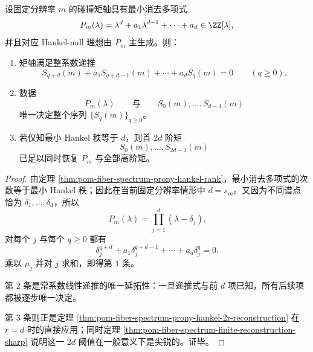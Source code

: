 \begin{theorem}\label{thm:conclusion-fixedresolution-principal-hankelnull-finite-determinacy}
设固定分辨率 \(m\) 的碰撞矩轴具有最小消去多项式
\[
P_m(\lambda)=\lambda^d+a_1\lambda^{d-1}+\cdots+a_d\in\ZZ[\lambda],
\]
并且对应 Hankel-null 理想由 \(P_m\) 主生成。则：
\begin{enumerate}
  \item 矩轴满足整系数递推
  \[
  S_{q+d}(m)+a_1S_{q+d-1}(m)+\cdots+a_dS_q(m)=0
  \qquad(q\ge 0).
  \]

  \item 数据
  \[
  P_m(\lambda)
  \qquad\text{与}\qquad
  S_0(m),\dots,S_{d-1}(m)
  \]
  唯一决定整个序列 \(\{S_q(m)\}_{q\ge 0}\)。

  \item 若仅知最小 Hankel 秩等于 \(d\)，则首 \(2d\) 阶矩
  \[
  S_0(m),\dots,S_{2d-1}(m)
  \]
  已足以同时恢复 \(P_m\) 与全部高阶矩。
\end{enumerate}
\end{theorem}
\begin{proof}
由定理 \ref{thm:pom-fiber-spectrum-prony-hankel-rank}，最小消去多项式的次数等于最小 Hankel 秩；因此在当前固定分辨率情形中 \(d=s_m\)。又因为不同谱点恰为 \(\delta_1,\dots,\delta_d\)，所以
\[
P_m(\lambda)=\prod_{j=1}^{d}(\lambda-\delta_j).
\]
对每个 \(j\) 与每个 \(q\ge 0\) 都有
\[
\delta_j^{q+d}+a_1\delta_j^{q+d-1}+\cdots+a_d\delta_j^q=0.
\]
乘以 \(\mu_j\) 并对 \(j\) 求和，即得第 \(1\) 条。

第 \(2\) 条是常系数线性递推的唯一延拓性：一旦递推式与前 \(d\) 项已知，所有后续项都被逐步唯一决定。

第 \(3\) 条则正是定理 \ref{thm:pom-fiber-spectrum-prony-hankel-2r-reconstruction} 在 \(r=d\) 时的直接应用；同时定理 \ref{thm:pom-fiber-spectrum-finite-reconstruction-sharp} 说明这一 \(2d\) 阈值在一般意义下是尖锐的。证毕。
\end{proof}

